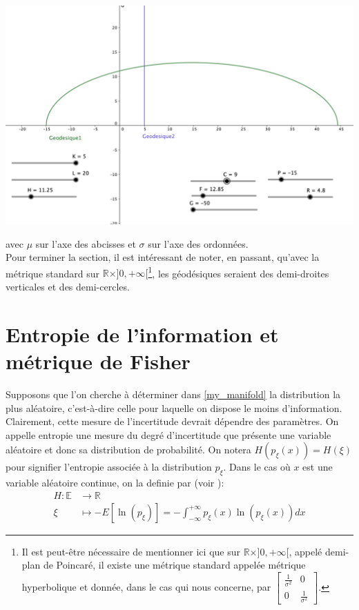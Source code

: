 \documentclass[11pt,french]{article}
\begin{document}
\begin{center}
    \includegraphics[scale=0.40]{image.png}
\end{center}    
avec $\mu$ sur l'axe des abcisses et $\sigma$ sur l'axe des ordonnées.\\     

Pour terminer la section, il est intéressant de noter, en passant, qu'avec la métrique standard sur $\mathbb{R}\times ]{0,+\infty[}$\footnote{Il est peut-être nécessaire de mentionner ici que sur $\mathbb{R}\times ]{0,+\infty[}$, appelé demi-plan de Poincaré, il existe une métrique standard appelée métrique hyperbolique et donnée, dans le cas qui nous concerne, par $\begin{bmatrix}
    \frac{1}{\sigma^2} & 0
    \\
    0 & \frac{1}{\sigma^2}
    \end{bmatrix}$.}, les géodésiques seraient des demi-droites verticales et des demi-cercles.\\



\section{Entropie de l'information et métrique de Fisher}
Supposons que l'on cherche à déterminer dans \eqref{my_manifold} la distribution la plus aléatoire, c'est-à-dire celle pour laquelle on dispose le moins d'information. Clairement, cette mesure  de l'incertitude devrait dépendre des paramètres. On appelle entropie une mesure du degré d'incertitude que présente une variable aléatoire et donc sa distribution de probabilité. On notera $H(p_{\xi}(x))=H(\xi)$ pour signifier l'entropie associée à la distribution $p_{\xi}$. Dans le cas où $x$ est une variable aléatoire continue, on la definie par (voir \cite[Section 3.2]{calin2014geometric}):
\begin{equation}\label{entropie}
    \begin{aligned}
    H\colon\mathbb{E} &\longrightarrow\mathbb{R} \\
    \xi &\longmapsto -E\left[\ln(p_{\xi})\right]=-\int_{-\infty}^{+\infty}p_{\xi}(x)\ln(p_{\xi}(x))dx 
\end{aligned}
\end{equation}
\end{document}
